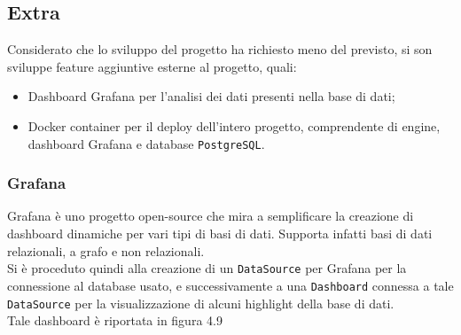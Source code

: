 	\subsection{Extra}
		Considerato che lo sviluppo del progetto ha richiesto meno del previsto, si son sviluppe feature aggiuntive esterne al progetto, quali:
		\begin{itemize}
			\item Dashboard Grafana per l'analisi dei dati presenti nella base di dati;
			\item Docker container per il deploy dell'intero progetto, comprendente di engine, dashboard Grafana e database \texttt{PostgreSQL}.
		\end{itemize}
		\subsubsection{Grafana}
			Grafana è uno progetto open-source che mira a semplificare la creazione di dashboard dinamiche per vari tipi di basi di dati. Supporta infatti basi di dati relazionali, a grafo e non relazionali.\\
			Si è proceduto quindi alla creazione di un \texttt{DataSource} per Grafana per la connessione al database usato, e successivamente a una \texttt{Dashboard} connessa a tale \texttt{DataSource} per la visualizzazione di alcuni highlight della base di dati. \\
			Tale dashboard è riportata in figura 4.9
			\newpage
